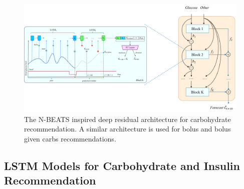 \documentclass[journal,article,submit,moreauthors,pdftex]{Definitions/mdpi}
\begin{document}
\begin{figure}[t]
    \includegraphics[width=\textwidth]{carbs-nbeats}
    \caption{The N-BEATS inspired deep residual architecture for carbohydrate recommendation. A similar architecture is used for bolus and bolus given carbs recommendations.}
    \label{fig:nbeats}
\end{figure}


\subsection{LSTM Models for Carbohydrate and Insulin Recommendation}
\label{sec:lstm}
\end{document}
